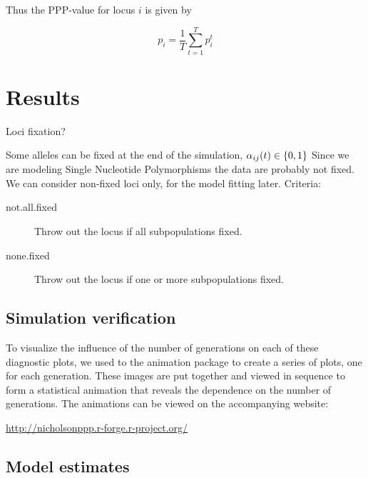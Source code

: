 \documentclass[a4paper,12pt]{article}
\begin{document}
Thus the PPP-value for locus $i$ is given by

$$
p_i = \frac 1 T \sum_{t=1}^T p_i^t
$$

\section{Results}


Loci fixation?

 Some alleles can be fixed at the end of the simulation,
  $\alpha_{ij}(t)\in\{0,1\}$
 Since we are modeling Single Nucleotide Polymorphisms the data
  are probably not fixed.
 We can consider non-fixed loci only, for the model fitting
  later.
 Criteria:
\begin{description}
\item[not.all.fixed] Throw out the locus if all subpopulations fixed.
\item[none.fixed] Throw out the locus if one or more subpopulations fixed.
\end{description}


\subsection{Simulation verification}




To visualize the influence of the number of generations on each of
these diagnostic plots, we used to the animation
package\cite{animation} to create a series of plots, one for each
generation. These images are put together and viewed in sequence to
form a statistical animation that reveals the dependence on the number
of generations. The animations can be viewed on the accompanying
website:

 \url{http://nicholsonppp.r-forge.r-project.org/}

\subsection{Model estimates}

\end{document}
